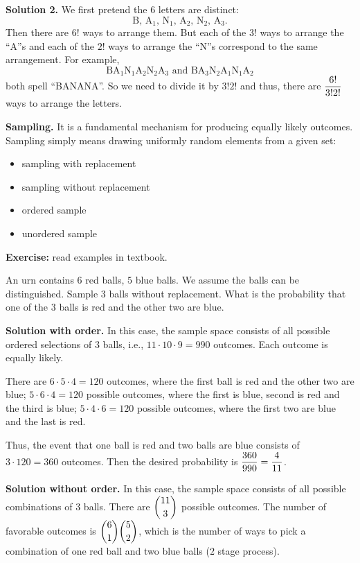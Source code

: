   \textbf{Solution 2.} We first pretend the $6$ letters are distinct: 
  \[
    \text{B, A$_1$, N$_1$, A$_2$, N$_2$, A$_3$}.
  \]
  Then there are $6!$ ways to arrange them. But each of the $3!$ ways to arrange
  the ``A''s and each of the $2!$ ways to arrange the ``N''s correspond to the
  same arrangement. For example, 
  \[
    \text{BA$_1$N$_1$A$_2$N$_2$A$_3$ and BA$_3$N$_2$A$_1$N$_1$A$_2$}
  \]
  both spell ``BANANA''. So we need to divide it by $3!2!$ and thus, there are
  $\displaystyle \frac{6!}{3!2!}$ ways to arrange the letters.

  \textbf{Sampling.} It is a fundamental mechanism for producing equally likely
  outcomes. Sampling simply means drawing uniformly random elements from a given
  set:
  \begin{itemize}
  \item sampling with replacement
  \item sampling without replacement
  \item ordered sample
  \item unordered sample
  \end{itemize}
  \textbf{Exercise:} read examples in textbook.
  \begin{example}
    An urn contains $6$ red balls, $5$ blue balls. We assume the balls can be distinguished. Sample $3$ balls without replacement.
    What is the probability that one of the $3$ balls is red and the other two
    are blue.
  \end{example}

  \textbf{Solution with order.} In this case, the sample space consists of all
  possible ordered selections of $3$ balls, i.e., $11\cdot 10\cdot 9 = 990$
  outcomes. Each outcome is equally likely.

  There are $6\cdot 5\cdot 4 = 120$ outcomes, where the first ball is red and
  the other two are blue; $5\cdot 6\cdot 4 = 120$ possible outcomes, where the
  first is blue, second is red and the third is blue; $5\cdot 4\cdot 6=120$
  possible outcomes, where the first two are blue and the last is red.

  Thus, the event that one ball is red and two balls are blue consists of
  $3\cdot 120 = 360$ outcomes. Then the desired probability is $\displaystyle
  \frac{360}{990}= \frac{4}{11}$.

  \textbf{Solution without order.} In this case, the sample space consists of
  all possible combinations of $3$ balls. There are $\displaystyle\binom{11}{3}$ possible
  outcomes. The number of favorable outcomes is $\displaystyle\binom{6}{1}\binom{5}{2}$,
  which is the number of ways to pick a combination of one red ball and two blue
  balls ($2$ stage process).

